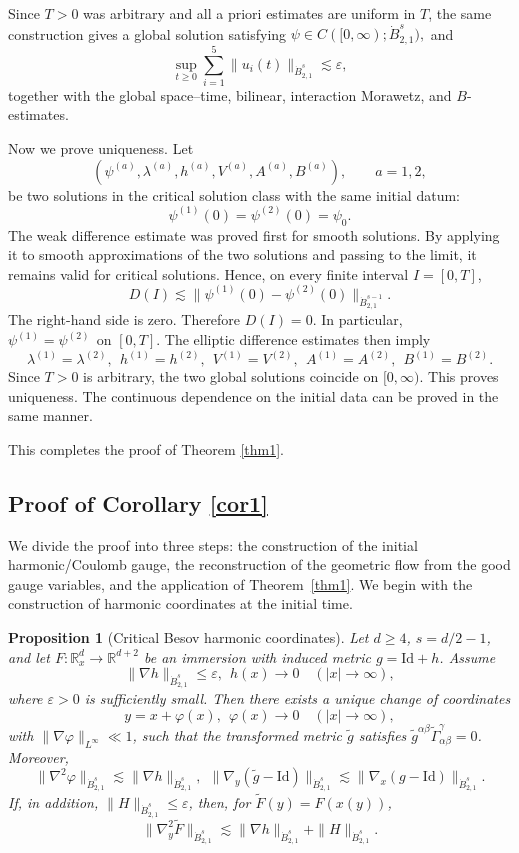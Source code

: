 \documentclass[11pt,letterpaper,reqno]{amsart}
\numberwithin{equation}{section}
\newtheorem{proposition}[theorem]{Proposition}
\theoremstyle{definition}
\theoremstyle{remark}
\begin{document}
Since \(T>0\) was arbitrary and all a priori estimates are uniform in
\(T\), the same construction gives a global solution satisfying
\(
\psi
\in
C([0,\infty);\dot B^s_{2,1}),
\)
and
\[
\sup_{t\geq0}
\sum_{i=1}^5
\|u_i(t)\|_{\dot B^s_{2,1}}
\lesssim
\varepsilon,
\]
together with the global space--time, bilinear, interaction Morawetz, and
\(B\)-estimates.

 
Now we prove uniqueness. Let
\[
\left(
\psi^{(a)},
\lambda^{(a)},
h^{(a)},
V^{(a)},
A^{(a)},
B^{(a)}
\right),
\qquad a=1,2,
\]
be two solutions in the critical solution class with the same initial datum:
\[
\psi^{(1)}(0)
=
\psi^{(2)}(0)
=
\psi_0.
\]
The weak difference estimate was proved first for smooth solutions. By
applying it to smooth approximations of the two solutions and passing to the
limit, it remains valid for critical solutions. Hence, on every finite
interval \(I=[0,T]\),
\[
D(I)
\lesssim
\|\psi^{(1)}(0)-\psi^{(2)}(0)\|_{\dot B^{s-1}_{2,1}}.
\]
The right-hand side is zero. Therefore
\(
D(I)=0.
\)
In particular,
\(
\psi^{(1)}
=
\psi^{(2)}
~~
\text{on }[0,T].
\)
The elliptic difference estimates then imply
\[
\lambda^{(1)}=\lambda^{(2)},
~~
h^{(1)}=h^{(2)},
~~
V^{(1)}=V^{(2)},
~~
A^{(1)}=A^{(2)},
~~
B^{(1)}=B^{(2)}.
\]
Since \(T>0\) is arbitrary, the two global solutions coincide on
\([0,\infty)\). This proves uniqueness. The continuous dependence on the initial data can be proved in the same manner. 

This completes the proof of Theorem \ref{thm1}.
 
\subsection{Proof of Corollary \ref{cor1}}

We divide the proof into three steps: the construction of the initial harmonic/Coulomb gauge, the reconstruction of the geometric flow from the good gauge variables, and the application of Theorem~\ref{thm1}. We begin with the construction of harmonic coordinates at the initial time.
\begin{proposition}[Critical Besov harmonic coordinates]
\label{prop:critical-besov-harmonic-coordinates}
Let $d\ge4$, $s=d/2-1$, and let $F:\mathbb{R}_x^d\to\mathbb{R}^{d+2}$ be an immersion with induced metric $g=\mathrm{Id}+h$. Assume
\[
 \|\nabla h\|_{\dot {B}^s_{2,1}}\le \varepsilon,
~~ h(x)\to0\quad (|x|\to\infty),
\]
where $\varepsilon>0$ is sufficiently small. Then there exists a unique change of coordinates
\[
 y=x+\varphi(x),~~ \varphi(x)\to0\quad (|x|\to\infty),
\]
with $\|\nabla\varphi\|_{L^\infty}\ll1$, such that the transformed metric $\widetilde g$ satisfies
$\widetilde g^{\alpha\beta}\widetilde\Gamma^\gamma_{\alpha\beta}=0$. Moreover,
\[
 \|\nabla^2\varphi\|_{\dot {B}^s_{2,1}}
 \lesssim \|\nabla h\|_{\dot {B}^s_{2,1}},
 ~~
 \|\nabla_y(\widetilde g-\mathrm{Id})\|_{\dot {B}^s_{2,1}}
 \lesssim \|\nabla_x(g-\mathrm{Id})\|_{\dot {B}^s_{2,1}}.
\]
If, in addition, $\|H\|_{\dot {B}^s_{2,1}}\le\varepsilon$, then, for $\widetilde F(y)=F(x(y))$,
\[
 \|\nabla_y^2\widetilde F\|_{\dot {B}^s_{2,1}}
 \lesssim \|\nabla h\|_{\dot {B}^s_{2,1}}+\|H\|_{\dot {B}^s_{2,1}}.
\]
\end{proposition}
\end{document}
